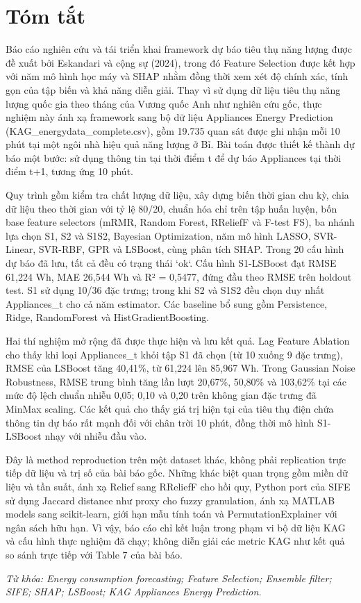 \chapter*{Tóm tắt}
\thispagestyle{plain}

Báo cáo nghiên cứu và tái triển khai framework dự báo tiêu thụ năng lượng được đề xuất bởi Eskandari và cộng sự (2024), trong đó Feature Selection được kết hợp với năm mô hình học máy và SHAP nhằm đồng thời xem xét độ chính xác, tính gọn của tập biến và khả năng diễn giải. Thay vì sử dụng dữ liệu tiêu thụ năng lượng quốc gia theo tháng của Vương quốc Anh như nghiên cứu gốc, thực nghiệm này ánh xạ framework sang bộ dữ liệu Appliances Energy Prediction (KAG\_energydata\_complete.csv), gồm 19.735 quan sát được ghi nhận mỗi 10 phút tại một ngôi nhà hiệu quả năng lượng ở Bỉ. Bài toán được thiết kế thành dự báo một bước: sử dụng thông tin tại thời điểm t để dự báo Appliances tại thời điểm t+1, tương ứng 10 phút.

Quy trình gồm kiểm tra chất lượng dữ liệu, xây dựng biến thời gian chu kỳ, chia dữ liệu theo thời gian với tỷ lệ 80/20, chuẩn hóa chỉ trên tập huấn luyện, bốn base feature selectors (mRMR, Random Forest, RReliefF và F-test FS), ba nhánh lựa chọn S1, S2 và S1S2, Bayesian Optimization, năm mô hình LASSO, SVR-Linear, SVR-RBF, GPR và LSBoost, cùng phân tích SHAP. Trong 20 cấu hình dự báo đã lưu, tất cả đều có trạng thái `ok`. Cấu hình S1-LSBoost đạt RMSE 61,224 Wh, MAE 26,544 Wh và R² = 0,5477, đứng đầu theo RMSE trên holdout test. S1 sử dụng 10/36 đặc trưng; trong khi S2 và S1S2 đều chọn duy nhất Appliances\_t cho cả năm estimator. Các baseline bổ sung gồm Persistence, Ridge, RandomForest và HistGradient\allowbreak Boosting.

Hai thí nghiệm mở rộng đã được thực hiện và lưu kết quả. Lag Feature Ablation cho thấy khi loại Appliances\_t khỏi tập S1 đã chọn (từ 10 xuống 9 đặc trưng), RMSE của LSBoost tăng 40,41\%, từ 61,224 lên 85,967 Wh. Trong Gaussian Noise Robustness, RMSE trung bình tăng lần lượt 20,67\%, 50,80\% và 103,62\% tại các mức độ lệch chuẩn nhiễu 0,05; 0,10 và 0,20 trên không gian đặc trưng đã MinMax scaling. Các kết quả cho thấy giá trị hiện tại của tiêu thụ điện chứa thông tin dự báo rất mạnh đối với chân trời 10 phút, đồng thời mô hình S1-LSBoost nhạy với nhiễu đầu vào.

Đây là method reproduction trên một dataset khác, không phải replication trực tiếp dữ liệu và trị số của bài báo gốc. Những khác biệt quan trọng gồm miền dữ liệu và tần suất, ánh xạ Relief sang RReliefF cho hồi quy, Python port của SIFE sử dụng Jaccard distance như proxy cho fuzzy granulation, ánh xạ MATLAB models sang scikit-learn, giới hạn mẫu tính toán và Permutation\allowbreak Explainer với ngân sách hữu hạn. Vì vậy, báo cáo chỉ kết luận trong phạm vi bộ dữ liệu KAG và cấu hình thực nghiệm đã chạy; không diễn giải các metric KAG như kết quả so sánh trực tiếp với Table 7 của bài báo.

\emph{Từ khóa: Energy consumption forecasting; Feature Selection; Ensemble filter; SIFE; SHAP; LSBoost; KAG Appliances Energy Prediction.}
\clearpage
